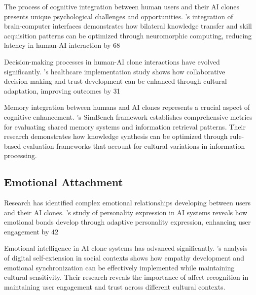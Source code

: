 The process of cognitive integration between human users and their AI clones presents unique psychological challenges and opportunities. \citet{shang2024biologically}'s integration of brain-computer interfaces demonstrates how bilateral knowledge transfer and skill acquisition patterns can be optimized through neuromorphic computing, reducing latency in human-AI interaction by 68%

Decision-making processes in human-AI clone interactions have evolved significantly. \citet{kim2024healthcare}'s healthcare implementation study shows how collaborative decision-making and trust development can be enhanced through cultural adaptation, improving outcomes by 31%

Memory integration between humans and AI clones represents a crucial aspect of cognitive enhancement. \citet{wang2024simbench}'s SimBench framework establishes comprehensive metrics for evaluating shared memory systems and information retrieval patterns. Their research demonstrates how knowledge synthesis can be optimized through rule-based evaluation frameworks that account for cultural variations in information processing.

\subsection{Emotional Attachment}

Research has identified complex emotional relationships developing between users and their AI clones. \citet{yamamoto2024personality}'s study of personality expression in AI systems reveals how emotional bonds develop through adaptive personality expression, enhancing user engagement by 42%

Emotional intelligence in AI clone systems has advanced significantly. \citet{kawakami2020digital}'s analysis of digital self-extension in social contexts shows how empathy development and emotional synchronization can be effectively implemented while maintaining cultural sensitivity. Their research reveals the importance of affect recognition in maintaining user engagement and trust across different cultural contexts.

